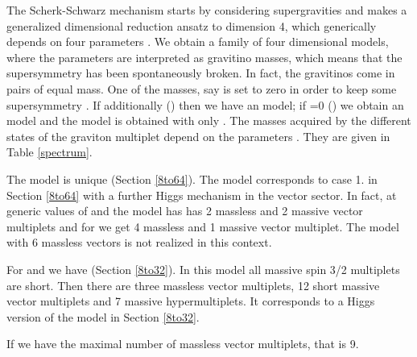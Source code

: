\documentclass[a4paper,12pt]{article}
\begin{document}
The Scherk-Schwarz mechanism starts by considering \coordHE{}
supergravities and makes a generalized  dimensional reduction
ansatz to dimension 4, which generically depends on four
parameters \coordHE{}. We obtain a family of four
dimensional models, where the parameters are interpreted as
gravitino masses, which means that the supersymmetry has been
spontaneously broken. In fact, the gravitinos come in pairs of
equal mass. One  of the masses, say \coordHE{} is set  to zero in order
to keep some supersymmetry \cite{fz}. If additionally  \coordHE{}
(\coordHE{}) then we have an \coordHE{} model; if \coordHE{}=0
(\coordHE{}) we obtain an \coordHE{} model and the \coordHE{} model
is obtained with only \coordHE{}. The masses acquired by the
different states of the graviton multiplet depend on the
parameters \coordHE{}. They are given in Table \ref{spectrum}.











The \coordHE{} model is unique (Section \ref{8to64}). The \coordHE{} model
corresponds to case 1. in Section \ref{8to64} with a further Higgs
mechanism in the vector sector. In fact, at generic values of
\coordHE{} and \coordHE{} the model has has 2   massless and 2   massive
vector multiplets and for \coordHE{} we get 4 massless and 1
massive vector multiplet. The model with 6 massless vectors is not
realized in this context.



For \coordHE{} and \coordHE{} we have
\coordHE{} (Section \ref{8to32}).  In this model all
massive  spin 3/2 multiplets  are short. Then there are three
massless vector multiplets, 12 short massive vector multiplets
and 7 massive hypermultiplets. It corresponds to a Higgs version
of the \coordHE{} model in Section \ref{8to32}.

If \coordHE{} we have the maximal number of
massless vector multiplets, that is 9.
\end{document}
